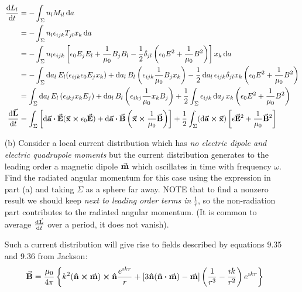 \documentclass[a4paper,twoside]{article}
\begin{document}
\begin{itemize}
\begin{problem}
\begin{align}
                \dv{L_l}{t} &= -\int_{\Sigma} n_l M_{il} \dd{a} \\
                &= - \int_{\Sigma} n_l \epsilon_{ijk} T_{jl} x_k \dd{a} \\
                &= - \int_{\Sigma} n_l \epsilon_{ijk} \left[ \epsilon_0 E_j E_l + \frac{1}{\mu_0} B_j B_l - \frac{1}{2} \delta_{jl} \left( \epsilon_0 E^2 + \frac{1}{\mu_0} B^2 \right) \right] x_k \dd{a} \\
                &= - \int_{\Sigma} \dd{a_l} E_l (\epsilon_{ijk} \epsilon_0 E_j x_k) + \dd{a_l} B_l \left( \epsilon_{ijk} \frac{1}{\mu_0} B_j x_k \right) - \frac{1}{2} \dd{a_l} \epsilon_{ijk} \delta_{jl} x_k \left( \epsilon_0 E^2 + \frac{1}{\mu_0} B^2 \right)  \\
                &= \int_{\Sigma} \dd{a_l} E_l \left( \epsilon_{ikj} x_k E_j \right) + \dd{a_l} B_l \left( \epsilon_{ikj} \frac{1}{\mu_0} x_k B_j  \right) + \frac{1}{2} \int_{\Sigma}  \epsilon_{ijk} \dd{a_j}  x_k \left( \epsilon_0 E^2 + \frac{1}{\mu_0} B^2 \right) \\
                \dv{ \va{L}}{t} &= \int_{\Sigma} \left[ \dd{ \va{a}} \vdot \va{E} ( \va{x} \cross \epsilon_0 \va{E}) + \dd{ \va{a}} \vdot \va{B} \left( \va{x} \cross \frac{1}{\mu_0} \va{B} \right) \right] + \frac{1}{2} \int_{\Sigma} ( \dd{ \va{a}} \cross \va{x}) \left[ \epsilon \va{E}^2 + \frac{1}{\mu_0} \va{B}^2 \right]
            \end{align}
        \end{problem}
    \item[(b)] Consider a local current distribution which has \textit{no electric dipole and electric quadrupole moments} but the current distribution generates to the leading order a magnetic dipole $ \va{m} $ which oscillates in time with frequency $ \omega $. Find the radiated angular momentum for this case using the expression in part (a) and taking $ \Sigma $ as a sphere far away. NOTE that to find a nonzero result we should keep \textit{next to leading order terms in} $ \frac{1}{r} $, so the  non-radiation part contributes to the radiated angular momentum. (It is common to average $ \dv{ \va{L}}{t} $ over a period, it does not vanish).
        \begin{problem}
            Such a current distribution will give rise to fields described by equations 9.35 and 9.36 from Jackson:
            \begin{equation}
                \va{B} = \frac{\mu_0}{4 \pi} \left\{ k^2 ( \vu{n} \cross \va{m}) \cross \vu{n} \frac{e^{\imath kr}}{r} + \left[ 3 \vu{n} (\vu{n} \vdot \va{m}) - \va{m} \right] \left( \frac{1}{r^3} - \frac{\imath k}{r^2} \right) e^{\imath kr} \right\}

\end{equation}
\end{problem}
\end{itemize}
\end{document}
